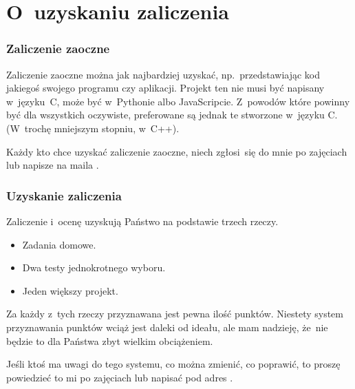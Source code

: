 \documentclass[10pt,t]{beamer}
\begin{document}
\section{O~uzyskaniu zaliczenia}



\begin{frame}
  \frametitle{Zaliczenie zaoczne}


  Zaliczenie zaoczne można jak najbardziej uzyskać, np.~przedstawiając
  kod jakiegoś swojego programu czy aplikacji. Projekt ten
  \alert{nie musi} być napisany w~języku~C, może być w~Pythonie albo
  JavaScripcie. Z~powodów które powinny być dla wszystkich oczywiste,
  preferowane są jednak te stworzone w~języku C. (W~trochę mniejszym
  stopniu, w~C++).

  Każdy kto chce uzyskać zaliczenie zaoczne, niech zgłosi~się do mnie po
  zajęciach lub napisze na maila \email.

\end{frame}





\begin{frame}
  \frametitle{Uzyskanie zaliczenia}


  Zaliczenie i~ocenę uzyskują Państwo na podstawie trzech rzeczy.

  \begin{itemize}

  \item Zadania domowe.

  \item Dwa testy jednokrotnego wyboru.

  \item Jeden większy projekt.

  \end{itemize}

  Za każdy z~tych rzeczy przyznawana jest pewna ilość punktów. Niestety
  system przyznawania punktów wciąż jest daleki od ideału, ale mam nadzieję,
  że~nie będzie to dla Państwa zbyt wielkim obciążeniem.

  Jeśli ktoś ma uwagi do tego systemu, co można zmienić, co poprawić, to
  proszę powiedzieć to mi po zajęciach lub napisać pod adres \email.

\end{frame}
\end{document}
